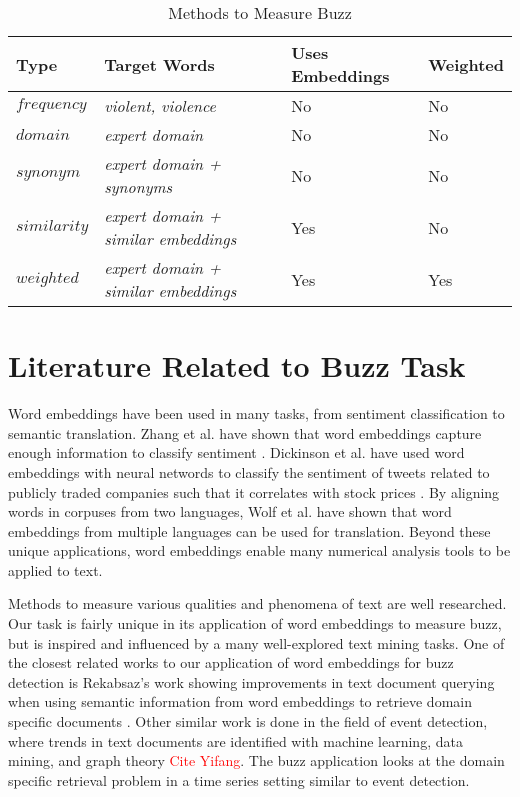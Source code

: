 \begin{table}
\begin{center}
\begin{tabular}{l|l|l|l}
\textbf{Type} & \textbf{Target Words} & \textbf{Uses Embeddings} & \textbf{Weighted} \\
\hline
$frequency$ & \textit{violent, violence} & No & No \\
$domain$ & \textit{expert domain} & No & No \\
$synonym$ & \textit{expert domain + synonyms} & No & No \\
$similarity$ & \textit{expert domain + similar embeddings} & Yes & No \\
$weighted$ & \textit{expert domain + similar embeddings} & Yes & Yes \\
\end{tabular}
\caption{Methods to Measure Buzz}
\label{table:buzztypes}
\end{center}
\end{table}

\section{Literature Related to Buzz Task}
\label{sec:literature-buzz}

Word embeddings have been used in many tasks, from sentiment classification to semantic translation. Zhang et al. have shown that word embeddings capture enough information to classify sentiment \cite{zhang2015chinese}. Dickinson et al. have used word embeddings with neural networds to classify the sentiment of tweets related to publicly traded companies such that it correlates with stock prices \cite{dickinson2015sentiment}. By aligning words in corpuses from two languages, Wolf et al. have shown that word embeddings from multiple languages can be used for translation. Beyond these unique applications, word embeddings enable many numerical analysis tools to be applied to text.

Methods to measure various qualities and phenomena of text are well researched. Our task is fairly unique in its application of word embeddings to measure buzz, but is inspired and influenced by a many well-explored text mining tasks. One of the closest related works to our application of word embeddings for buzz detection is Rekabsaz's work showing improvements in text document querying when using semantic information from word embeddings to retrieve domain specific documents \cite{rekabsazusing}. Other similar work is done in the field of event detection, where trends in text documents are identified with machine learning, data mining, and graph theory \cite{radinsky2012learning} \textcolor{red}{Cite Yifang}. The buzz application looks at the domain specific retrieval problem in a time series setting similar to event detection.

